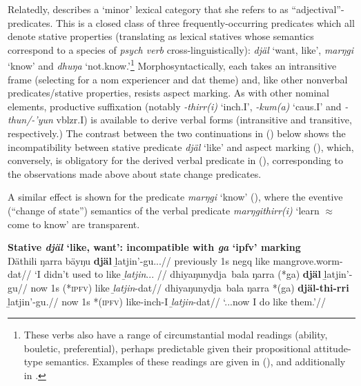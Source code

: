 Relatedly, \citet[557]{Wilkinson1991} describes a `minor' lexical category that she refers to as ``adjectival''-predicates. This is a closed class of three frequently-occurring predicates which all denote stative properties (translating as lexical statives whose semantics correspond to a species of \textit{psych verb} cross-linguistically): \textit{djäl} `want, like', \textit{marŋgi} `know' and \textit{dhuŋa} `not.know.'\footnote{These verbs also have a range of circumstantial modal readings (ability, bouletic, preferential), perhaps predictable given their propositional attitude-type semantics. Examples of these readings are given in (), and additionally in \citet[648]{Wilkinson1991}.} Morphosyntactically, each takes an intransitive frame (selecting for a \gls{nom} experiencer and \gls{dat} theme) and, like other nonverbal predicates/stative properties, resists aspect marking. As with other nominal elements, productive suffixation (notably \textit{-thirr(i)} `\gls{inch}.\gls{I}', \textit{-kum(a)} `\gls{caus}.\gls{I}' and \textit{-thun/-'yun} \gls{vblzr}.\gls{I}) is available to derive verbal forms (intransitive and transitive, respectively.) The contrast between the two continuations in () below shows the incompatibility between stative predicate \textit{djäl} `like' and aspect marking (), which, conversely, is obligatory for the derived verbal predicate in (), corresponding to the observations made above about state change predicates.

A similar effect is shown for the predicate \textit{marŋgi} `know' (), where the eventive (``change of state'') semantics of the verbal predicate \textit{marŋgithirr(i)} `learn $ \approx $ come to know' are transparent.


\pex{}\textbf{Stative \textit{djäl} `like, want': incompatible with \textit{ga }`\gls{ipfv}' marking}\\
\begingl\gla Ŋäthili ŋarra bäyŋu \textbf{djäl} ḻatjin'-gu...//
\glb previously 1s \gls{negq} like mangrove.worm-\gls{dat}//
\glft`I didn't used to like \emph{ḻatjin}... //\endgl
\a{}\begingl\gla {} dhiyaŋunydja~bala ŋarra (*ga) \textbf{djäl} ḻatjin'-gu//
\glb now 1s (*\textsc{ipfv}) like \textit{ḻatjin}-\gls{dat}//
\endgl
\a{}\begingl\gla {} dhiyaŋunydja~bala ŋarra *(ga) \textbf{djäl-thi-rri} ḻatjin'-gu.//
\glb now 1s *(\textsc{ipfv}) like-\gls{inch}-\gls{I} \textit{ḻatjin}-\gls{dat}//
\glft`...now I do like them.'\trailingcitation{[DhG~20190417]}//\endgl
\xe





